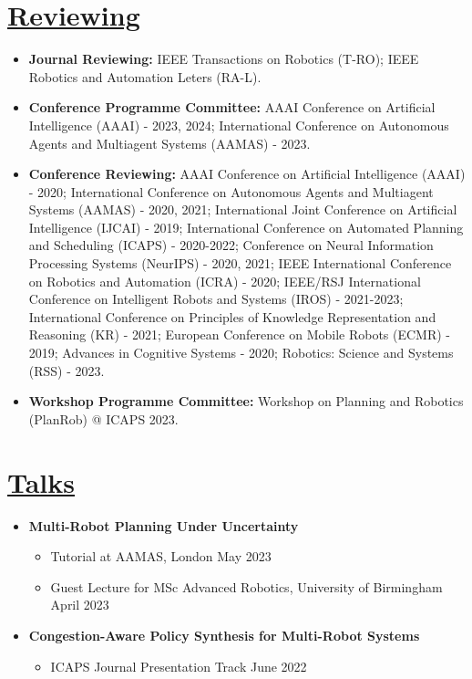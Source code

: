 \documentclass[11pt]{article}
\begin{document}
\section*{\uline{Reviewing\hfill}}
\vspace{-5pt}
\begin{itemize}
\item \textbf{Journal Reviewing:} IEEE Transactions on Robotics (T-RO); IEEE Robotics and Automation Leters (RA-L).
\item \textbf{Conference Programme Committee:}  AAAI Conference on Artificial Intelligence (AAAI) - 2023, 2024; International Conference on Autonomous Agents and Multiagent Systems (AAMAS) - 2023.
\item \textbf{Conference Reviewing:} AAAI Conference on Artificial Intelligence (AAAI) - 2020; International Conference on Autonomous Agents and Multiagent Systems (AAMAS) - 2020, 2021; International Joint Conference on Artificial Intelligence (IJCAI) - 2019; International Conference on Automated Planning and Scheduling (ICAPS) - 2020-2022; Conference on Neural Information Processing Systems (NeurIPS) - 2020, 2021; IEEE International Conference on Robotics and Automation (ICRA) - 2020; IEEE/RSJ International Conference on Intelligent Robots and Systems (IROS) - 2021-2023; International Conference on Principles of Knowledge Representation and Reasoning (KR) - 2021; European Conference on Mobile Robots (ECMR) - 2019; Advances in Cognitive Systems - 2020; Robotics: Science and Systems (RSS) - 2023.
\item\textbf{Workshop Programme Committee:} Workshop on Planning and Robotics (PlanRob) @ ICAPS 2023.
\end{itemize}

\vspace{-10pt}
\section*{\uline{Talks\hfill}}
\vspace{-5pt}
\begin{itemize}
\item \textbf{Multi-Robot Planning Under Uncertainty}
\begin{itemize}
\item Tutorial at AAMAS, London \hfill May 2023
\item Guest Lecture for MSc Advanced Robotics, University of Birmingham \hfill April 2023
\end{itemize}
\item \textbf{Congestion-Aware Policy Synthesis for Multi-Robot Systems}
\begin{itemize}
\item ICAPS Journal Presentation Track \hfill June 2022
\end{itemize}
\end{itemize}
\end{document}
